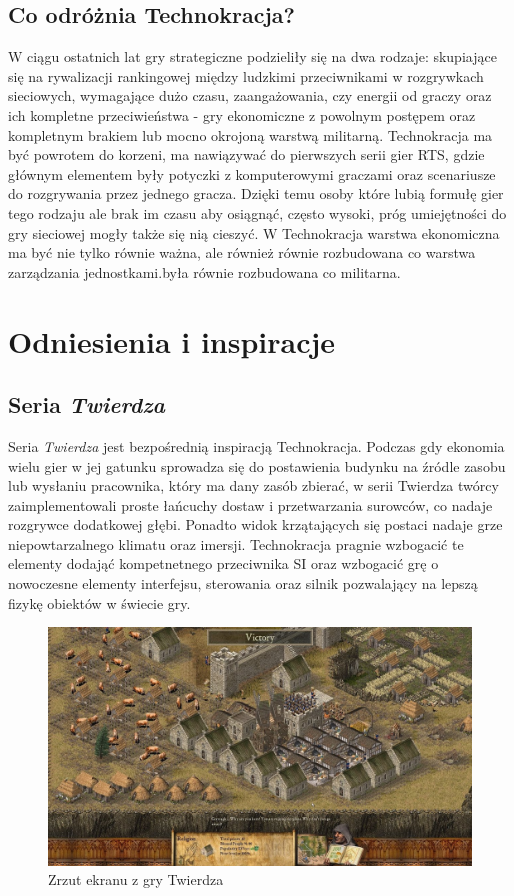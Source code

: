\documentclass[a4paper]{scrreprt}
\def \GameTiTle{Technokracja}
\begin{document}
\section{Co odróżnia \GameTiTle?}
W ciągu ostatnich lat gry strategiczne podzieliły się na dwa rodzaje: skupiające się na rywalizacji rankingowej między ludzkimi przeciwnikami w rozgrywkach sieciowych, wymagające dużo czasu, zaangażowania, czy energii od graczy oraz ich kompletne przeciwieństwa - gry ekonomiczne z powolnym postępem oraz kompletnym brakiem lub mocno okrojoną warstwą militarną.
\GameTiTle{} ma być powrotem do korzeni, ma nawiązywać do pierwszych serii gier RTS, gdzie głównym elementem były potyczki z komputerowymi graczami oraz scenariusze do rozgrywania przez jednego gracza. Dzięki temu osoby które lubią formułę gier tego rodzaju ale brak im czasu aby osiągnąć, często wysoki, próg umiejętności do gry sieciowej mogły także się nią cieszyć. 
W \GameTiTle{} warstwa ekonomiczna ma być nie tylko równie ważna, ale również równie rozbudowana co warstwa zarządzania jednostkami.była równie rozbudowana co militarna.


\chapter{Odniesienia i inspiracje} 

\section{Seria \emph{Twierdza}}
Seria \emph{Twierdza} jest bezpośrednią 
inspiracją \GameTiTle{}. Podczas gdy ekonomia wielu gier w jej gatunku sprowadza się do postawienia budynku na źródle zasobu lub wysłaniu pracownika, który ma dany zasób zbierać, w serii Twierdza twórcy zaimplementowali proste łańcuchy dostaw i przetwarzania surowców, co nadaje rozgrywce dodatkowej głębi. Ponadto widok krzątających się postaci nadaje grze niepowtarzalnego klimatu oraz imersji. \GameTiTle{} pragnie wzbogacić te elementy dodająć kompetnetnego przeciwnika SI oraz wzbogacić grę o nowoczesne elementy interfejsu, sterowania oraz silnik pozwalający na lepszą fizykę obiektów w świecie gry.

\begin{figure}[hb]
\centering
\includegraphics[width=1\textwidth]{stronghold2.jpg}
\caption{\label{} Zrzut ekranu z gry Twierdza}
\end{figure}
\newpage
\end{document}

